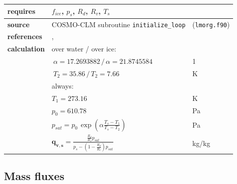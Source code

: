 \documentclass[a4paper,titlepage]{scrartcl}
\begin{document}
\begin{tabular}{|lll|}
  \hline
  \textbf{requires} & $f_{ice}$, $p_s$, $R_d$, $R_v$, $T_s$ & \\
  \hline
  \textbf{source}   & COSMO-CLM subroutine \texttt{initialize\_loop}                                   & (\texttt{lmorg.f90}) \\
	\hline
	\textbf{references}  & \cite{Lowe1977}, \cite{Murray1967}                                                      &  \\
  \hline
  \textbf{calculation} & over water / over ice:                                                                   &  \\
											 & $\: \alpha = 17.2693882 \, / \, \alpha = 21.8745584$                                     & 1 \\
											 & $\: T_2 = 35.86 \, / \, T_2 = 7.66$                                                      & K \\
											 & always:                                                                                  & \\
											 & $T_1 = 273.16$																															              & K \\
											 & $p_0 = 610.78$                                                                           & Pa \\
                       & $p_{sat} = p_0 \, \exp \left( \alpha \frac{T_s - T_1}{T_s - T_2} \right)    $               & Pa \\
                       & $\mathbf{q_{v,s}} = \frac{ \frac{R_d}{R_v} p_{sat}}{p_s - \left(1-\frac{R_d}{R_v}\right) p_{sat}}$ & kg/kg \\
  \hline
\end{tabular}


\newpage
\subsection{Mass fluxes}
\end{document}
